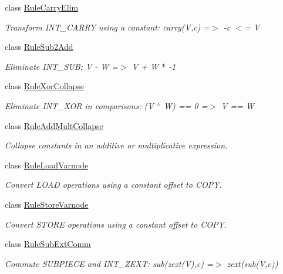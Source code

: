\begin{DoxyCompactItemize}
class \mbox{\hyperlink{class_rule_carry_elim}{Rule\+Carry\+Elim}}
\begin{DoxyCompactList}\small\item\em Transform I\+N\+T\+\_\+\+C\+A\+R\+RY using a constant\+: {\ttfamily carry(\+V,c) =$>$ -\/c $<$= V} \end{DoxyCompactList}\item 
class \mbox{\hyperlink{class_rule_sub2_add}{Rule\+Sub2\+Add}}
\begin{DoxyCompactList}\small\item\em Eliminate I\+N\+T\+\_\+\+S\+UB\+: {\ttfamily V -\/ W =$>$ V + W $\ast$ -\/1} \end{DoxyCompactList}\item 
class \mbox{\hyperlink{class_rule_xor_collapse}{Rule\+Xor\+Collapse}}
\begin{DoxyCompactList}\small\item\em Eliminate I\+N\+T\+\_\+\+X\+OR in comparisons\+: {\ttfamily (V $^\wedge$ W) == 0 =$>$ V == W} \end{DoxyCompactList}\item 
class \mbox{\hyperlink{class_rule_add_mult_collapse}{Rule\+Add\+Mult\+Collapse}}
\begin{DoxyCompactList}\small\item\em Collapse constants in an additive or multiplicative expression. \end{DoxyCompactList}\item 
class \mbox{\hyperlink{class_rule_load_varnode}{Rule\+Load\+Varnode}}
\begin{DoxyCompactList}\small\item\em Convert L\+O\+AD operations using a constant offset to C\+O\+PY. \end{DoxyCompactList}\item 
class \mbox{\hyperlink{class_rule_store_varnode}{Rule\+Store\+Varnode}}
\begin{DoxyCompactList}\small\item\em Convert S\+T\+O\+RE operations using a constant offset to C\+O\+PY. \end{DoxyCompactList}\item 
class \mbox{\hyperlink{class_rule_sub_ext_comm}{Rule\+Sub\+Ext\+Comm}}
\begin{DoxyCompactList}\small\item\em Commute S\+U\+B\+P\+I\+E\+CE and I\+N\+T\+\_\+\+Z\+E\+XT\+: {\ttfamily sub(zext(\+V),c) =$>$ zext(sub(\+V,c))} \end{DoxyCompactList}\item 

\end{DoxyCompactItemize}
